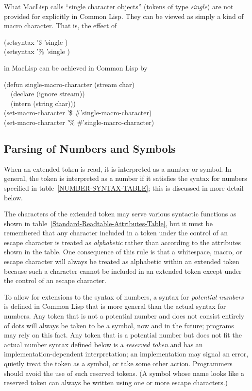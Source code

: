 \begin{incompatibility}
What MacLisp calls ``single character objects''
(tokens of type \emph{single}) are not provided for explicitly in Common Lisp.
They can be viewed as simply a kind of macro character.
That is, the effect of
\begin{lisp}
(setsyntax '\$ 'single {\false}) \\
(setsyntax '\% 'single {\false})
\end{lisp}
in MacLisp can be achieved in Common Lisp by
\begin{lisp}
(defun single-macro-character (stream char) \\
~~(declare (ignore stream)) \\
~~(intern (string char))) \\
(set-macro-character '\$ \#'single-macro-character) \\
(set-macro-character '\% \#'single-macro-character)
\end{lisp}
\end{incompatibility}
\afternoterule


\subsection{Parsing of Numbers and Symbols}
\label{PARSE-TOKENS-SECTION}

When an extended token is read, it is interpreted as a number or symbol.
In general, the token is interpreted as a number if it satisfies
the syntax for numbers specified in table~\ref{NUMBER-SYNTAX-TABLE};
this is discussed in more detail below.

The characters of the extended token may serve various syntactic
functions as shown
in table~\ref{Standard-Readtable-Attributes-Table}, but it must be
remembered that any character included in a token under the control
of an escape character is treated as \emph{alphabetic} rather than
according to the attributes shown in the table.
One consequence of this rule is that a whitespace, macro, or escape
character will always be treated as alphabetic within an extended token
because such a character cannot be included in an extended
token except under the control of an escape character.

To allow for extensions to the syntax of numbers, a
syntax for \emph{potential numbers} is defined in Common Lisp that is
more general than the actual syntax for numbers.
Any token that is not a potential number and does not consist
entirely of dots will always be taken to be a symbol,
now and in the future; programs may rely on this fact.
Any token that is a potential number but does not fit the
actual number syntax defined below is a \emph{reserved token} and
has an implementation-dependent interpretation;
an implementation may signal an error, quietly treat the token
as a symbol, or take some other action.  Programmers should avoid
the use of such reserved tokens.  (A symbol whose name looks like a reserved
token can always be written using one or more escape characters.)

